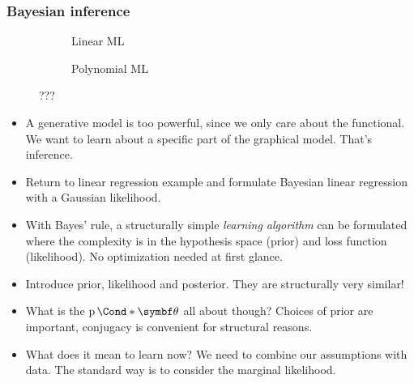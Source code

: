 \subsubsection{Bayesian inference}
\begin{figure}[t]
    \begin{subfigure}[b]{\halffigurewidth}
        \centering
        \caption{
            Linear ML
            \label{fig:bayesian_ml:polynoms:bayes_narrow}
        }
    \end{subfigure}
    \hfill
    \begin{subfigure}[b]{\halffigurewidth}
        \centering
        \caption{
            Polynomial ML
            \label{fig:bayesian_ml:polynoms:bayes_broad}
        }
    \end{subfigure}
    \caption[ML Interpolation]{
        ???
        \label{fig:bayesian_ml:polynoms:bayes}
    }
\end{figure}
\begin{itemize}
    \item A generative model is too powerful, since we only care about the functional. We want to learn about a specific part of the graphical model. That's inference.
    \item Return to linear regression example and formulate Bayesian linear regression with a Gaussian likelihood.
    \item With Bayes' rule, a structurally simple \emph{learning algorithm} can be formulated where the complexity is in the hypothesis space (prior) and loss function (likelihood). No optimization needed at first glance.
    \item Introduce prior, likelihood and posterior. They are structurally very similar!
    \item What is the $\Prob*{\mat{\theta}}$ all about though? Choices of prior are important, conjugacy is convenient for structural reasons.
    \item What does it mean to learn now? We need to combine our assumptions with data. The standard way is to consider the marginal likelihood.
\end{itemize}

